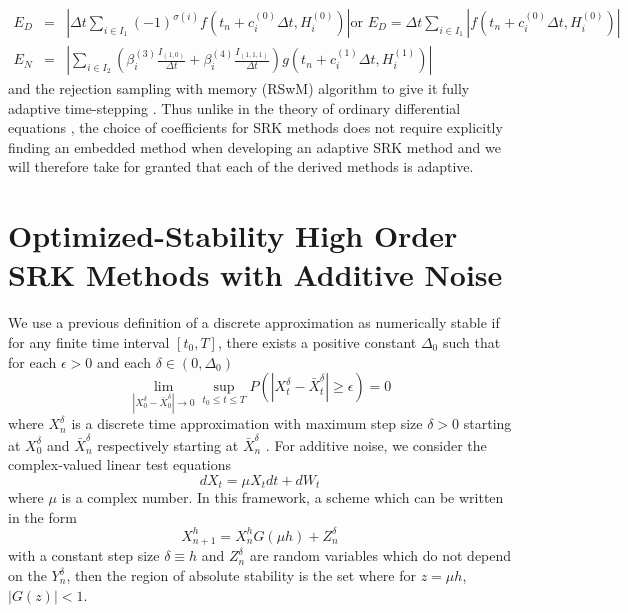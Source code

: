 \documentclass{article}
\begin{document}
\begin{eqnarray*}
	E_{D} & = & \left|\Delta t\sum_{i\in I_{1}}(-1)^{\sigma(i)}f\left(t_{n}+c_{i}^{(0)}\Delta t,H_{i}^{(0)}\right)\right|\mbox{or }E_{D}=\Delta t\sum_{i\in I_{1}}\left|f\left(t_{n}+c_{i}^{(0)}\Delta t,H_{i}^{(0)}\right)\right|\\
	E_{N} & = & \left|\sum_{i\in I_{2}}\left(\beta_{i}^{(3)}\frac{I_{(1,0)}}{\Delta t}+\beta_{i}^{(4)}\frac{I_{(1,1,1)}}{\Delta t}\right)g\left(t_{n}+c_{i}^{(1)}\Delta t,H_{i}^{(1)}\right)\right|
\end{eqnarray*}
and the rejection sampling with memory (RSwM) algorithm to give it
fully adaptive time-stepping \cite{RN3787}. Thus unlike in the theory
of ordinary differential equations \cite{RN3512,RN3513,RN3519,RN3523,RN3518},
the choice of coefficients for SRK methods does not require explicitly
finding an embedded method when developing an adaptive SRK method
and we will therefore take for granted that each of the derived methods
is adaptive.


\section{Optimized-Stability High Order SRK Methods with Additive Noise}

We use a previous definition of a discrete approximation as numerically
stable if for any finite time interval $\left[t_{0},T\right]$, there
exists a positive constant $\Delta_{0}$ such that for each $\epsilon>0$
and each $\delta\in\left(0,\Delta_{0}\right)$
\begin{equation}
\lim_{\left|X_{0}^{\delta}-\bar{X}_{0}^{\delta}\right|\rightarrow0}\sup_{t_{0}\leq t\leq T}P\left(\left|X_{t}^{\delta}-\bar{X}_{t}^{\delta}\right|\geq\epsilon\right)=0\label{eq:add_stab}
\end{equation}
where $X_{n}^{\delta}$ is a discrete time approximation with maximum
step size $\delta>0$ starting at $X_{0}^{\delta}$ and $\bar{X}_{n}^{\delta}$
respectively starting at $\bar{X}_{n}^{\delta}$ \cite{RN3169}. For
additive noise, we consider the complex-valued linear test equations
\begin{equation}
dX_{t}=\mu X_{t}dt+dW_{t}\label{eq:add_test}
\end{equation}
where $\mu$ is a complex number. In this framework, a scheme which
can be written in the form
\begin{equation}
X_{n+1}^{h}=X_{n}^{h}G\left(\mu h\right)+Z_{n}^{\delta}\label{eq:add_test_2}
\end{equation}
with a constant step size $\delta\equiv h$ and $Z_{n}^{\delta}$
are random variables which do not depend on the $Y_{n}^{\delta}$,
then the region of absolute stability is the set where for $z=\mu h$,
$\left|G(z)\right|<1$.
\end{document}

